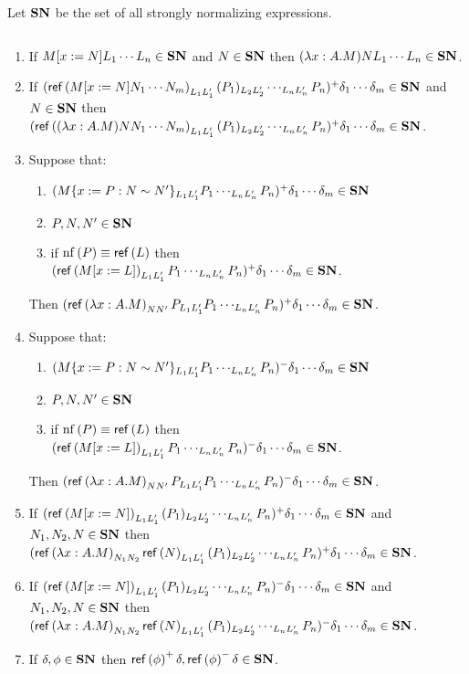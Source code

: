 
Let $\mathbf{SN}$ be the set of all strongly normalizing expressions.

\begin{lemma}
\label{lm:SN}
$ $
\begin{enumerate}
\item
\label{lm:SN1}
If $M[x:=N]L_1 \cdots L_n \in \mathbf{SN}$ and $N \in \mathbf{SN}$ then $(\lambda x:A.M)NL_1 \cdots L_n \in \mathbf{SN}$.
\item
\label{lm:SN2}
If $(\mathsf{ref} \left( {M[x:=N]N_1 \cdots N_m} \right)_{L_1 L_1'} (P_1)_{L_2 L_2'} \cdots_{L_n L_n'} P_n)^+ \delta_1 \cdots \delta_m \in \mathbf{SN}$ and $N \in \mathbf{SN}$ then
$(\mathsf{ref} \left( {(\lambda x:A.M)NN_1 \cdots N_m} \right)_{L_1 L_1'} (P_1)_{L_2 L_2'} \cdots_{L_n L_n'} P_n)^+ \delta_1 \cdots \delta_m \in \mathbf{SN}$.
\item
\label{lm:SN3}
Suppose that:
\begin{enumerate}
\item
\label{hypi}
$(M\{x:=P:N\sim N'\}_{L_1 L_1'} P_1 \cdots_{L_n L_n'} P_n)^+ \delta_1 \cdots \delta_m \in \mathbf{SN}$
\item
$P, N, N' \in \mathbf{SN}$
\item
\label{hypiii}
if $\mathrm{nf} \left( {P} \right) \equiv \mathsf{ref} \left( {L} \right)$ then $(\mathsf{ref} \left( {M[x:=L]} \right)_{L_1 L_1'} P_1 \cdots_{L_n L_n'} P_n)^+ \delta_1 \cdots \delta_m \in \mathbf{SN}$.
\end{enumerate}
Then $(\mathsf{ref} \left( {\lambda x:A.M} \right)_{N N'} P_{L_1 L_1'} P_1 \cdots_{L_n L_n'} P_n)^+ \delta_1 \cdots \delta_m \in \mathbf{SN}$.
\item
Suppose that:
\begin{enumerate}
\item
\label{hypi}
$(M\{x:=P:N\sim N'\}_{L_1 L_1'} P_1 \cdots_{L_n L_n'} P_n)^- \delta_1 \cdots \delta_m \in \mathbf{SN}$
\item
$P, N, N' \in \mathbf{SN}$
\item
\label{hypiii}
if $\mathrm{nf} \left( {P} \right) \equiv \mathsf{ref} \left( {L} \right)$ then $(\mathsf{ref} \left( {M[x:=L]} \right)_{L_1 L_1'} P_1 \cdots_{L_n L_n'} P_n)^- \delta_1 \cdots \delta_m \in \mathbf{SN}$.
\end{enumerate}
Then $(\mathsf{ref} \left( {\lambda x:A.M} \right)_{N N'} P_{L_1 L_1'} P_1 \cdots_{L_n L_n'} P_n)^- \delta_1 \cdots \delta_m \in \mathbf{SN}$.
\item
\label{lm:SN4}
If $(\mathsf{ref} \left( {M[x:=N]} \right)_{L_1 L_1'} (P_1)_{L_2 L_2'} \cdots_{L_n L_n'} P_n)^+ \delta_1 \cdots \delta_m \in \mathbf{SN}$ and $N_1, N_2, N \in \mathbf{SN}$ then \\
$(\mathsf{ref} \left( {\lambda x:A.M} \right)_{N_1 N_2}\mathsf{ref} \left( {N} \right)_{L_1 L_1'} (P_1)_{L_2 L_2'} \cdots_{L_n L_n'} P_n)^+ \delta_1 \cdots \delta_m \in \mathbf{SN}$.
\item
If $(\mathsf{ref} \left( {M[x:=N]} \right)_{L_1 L_1'} (P_1)_{L_2 L_2'} \cdots_{L_n L_n'} P_n)^- \delta_1 \cdots \delta_m \in \mathbf{SN}$ and $N_1, N_2, N \in \mathbf{SN}$ then \\
$(\mathsf{ref} \left( {\lambda x:A.M} \right)_{N_1 N_2}\mathsf{ref} \left( {N} \right)_{L_1 L_1'} (P_1)_{L_2 L_2'} \cdots_{L_n L_n'} P_n)^- \delta_1 \cdots \delta_m \in \mathbf{SN}$.
\item
\label{lm:SN5}
If $\delta, \phi \in \mathbf{SN}$ then $\mathsf{ref} \left( {\phi} \right)^+ \delta, \mathsf{ref} \left( {\phi} \right)^- \delta \in \mathbf{SN}$.
\end{enumerate}
\end{lemma}

